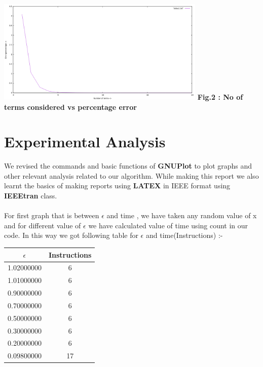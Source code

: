 \documentclass[conference]{IEEEtran}
\begin{document}
{{\includegraphics[height =  5.0cm,width = \linewidth]{graph1.png}
\textbf{Fig.2 :  No of terms considered vs  percentage error }\\


\section{\textbf{Experimental Analysis}}
We revised the commands and basic functions of \textbf{GNUPlot} to plot   graphs and other relevant analysis related to our algorithm. While making this report we also learnt the basics of making reports using \textbf{LATEX} in IEEE format using \textbf{IEEEtran} class. \\\\ 
For first graph that is between $\epsilon$ and time , we have taken any random value of x and for different value of $\epsilon$ we have calculated value of time using count in our code. In this way we got following table for $\epsilon$ and time(Instructions) :-\\
\begin{table}[h!]
\begin{center}
    \label{tab:table1}
    \begin{tabular}{|c|c|} %
   \hline
     \textbf{$\epsilon$} & \textbf{Instructions}\\
     \hline
      1.02000000  & 6 \\
      \hline
      1.01000000  & 6\\
      \hline
      0.90000000  & 6\\
      \hline
      0.70000000  & 6\\
      \hline
      0.50000000  & 6\\
      \hline
      0.30000000  & 6\\
      \hline
      0.20000000 & 6\\
      \hline
      0.09800000 & 17\\
      \hline

\end{tabular}
\end{center}
\end{table}}}
\end{document}
